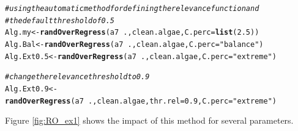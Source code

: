 \documentclass[10pt,a4paper]{article}\usepackage[]{graphicx}\usepackage[]{color}
\makeatletter
\newcommand{\hlnum}[1]{\textcolor[rgb]{0.686,0.059,0.569}{#1}}%
\newcommand{\hlstr}[1]{\textcolor[rgb]{0.192,0.494,0.8}{#1}}%
\newcommand{\hlcom}[1]{\textcolor[rgb]{0.678,0.584,0.686}{\textit{#1}}}%
\newcommand{\hlopt}[1]{\textcolor[rgb]{0,0,0}{#1}}%
\newcommand{\hlstd}[1]{\textcolor[rgb]{0.345,0.345,0.345}{#1}}%
\newcommand{\hlkwb}[1]{\textcolor[rgb]{0.69,0.353,0.396}{#1}}%
\newcommand{\hlkwc}[1]{\textcolor[rgb]{0.333,0.667,0.333}{#1}}%
\newcommand{\hlkwd}[1]{\textcolor[rgb]{0.737,0.353,0.396}{\textbf{#1}}}%
\newenvironment{kframe}{%
 \def\at@end@of@kframe{}%
 \ifinner\ifhmode%
  \def\at@end@of@kframe{\end{minipage}}%
  \begin{minipage}{\columnwidth}%
 \fi\fi%
 \def\FrameCommand##1{\hskip\@totalleftmargin \hskip-\fboxsep
 \colorbox{shadecolor}{##1}\hskip-\fboxsep
     \hskip-\linewidth \hskip-\@totalleftmargin \hskip\columnwidth}%
 \MakeFramed {\advance\hsize-\width
   \@totalleftmargin\z@ \linewidth\hsize
   \@setminipage}}%
 {\par\unskip\endMakeFramed%
 \at@end@of@kframe}
\newenvironment{knitrout}{}{} %
\makeatother
\begin{document}
\begin{knitrout}\footnotesize
{}\color{fgcolor}\begin{kframe}
\begin{alltt}
\hlcom{# using the automatic method for defining the relevance function and}
\hlcom{# the default threshold of 0.5}
\hlstd{Alg.my} \hlkwb{<-} \hlkwd{randOverRegress}\hlstd{(a7}\hlopt{~}\hlstd{., clean.algae,} \hlkwc{C.perc}\hlstd{=}\hlkwd{list}\hlstd{(}\hlnum{2.5}\hlstd{))}
\hlstd{Alg.Bal} \hlkwb{<-} \hlkwd{randOverRegress}\hlstd{(a7}\hlopt{~}\hlstd{., clean.algae,} \hlkwc{C.perc}\hlstd{=}\hlstr{"balance"}\hlstd{)}
\hlstd{Alg.Ext0.5} \hlkwb{<-} \hlkwd{randOverRegress}\hlstd{(a7}\hlopt{~}\hlstd{., clean.algae,} \hlkwc{C.perc}\hlstd{=}\hlstr{"extreme"}\hlstd{)}

\hlcom{# change the relevance threshold to 0.9}
\hlstd{Alg.Ext0.9} \hlkwb{<-} \hlkwd{randOverRegress}\hlstd{(a7}\hlopt{~}\hlstd{., clean.algae,} \hlkwc{thr.rel}\hlstd{=}\hlnum{0.9}\hlstd{,} \hlkwc{C.perc}\hlstd{=}\hlstr{"extreme"}\hlstd{)}
\end{alltt}
\end{kframe}
\end{knitrout}


Figure \ref{fig:RO_ex1} shows the impact of this method for several parameters.
\end{document}

